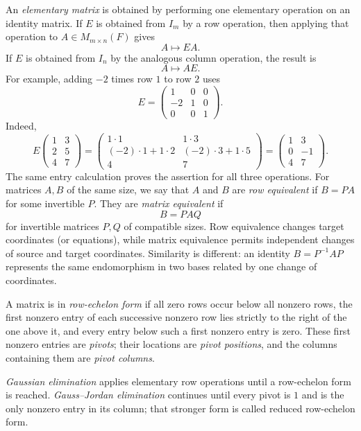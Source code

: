 An \emph{elementary matrix} is obtained by performing one elementary
operation on an identity matrix.  If \(E\) is obtained from \(I_m\) by a row
operation, then applying that operation to \(A\in M_{m\times n}(F)\) gives
\[
A\longmapsto EA.
\]
If \(E\) is obtained from \(I_n\) by the analogous column operation, the
result is
\[
A\longmapsto AE.
\]
For example, adding \(-2\) times row \(1\) to row \(2\) uses
\[
E=\begin{pmatrix}1&0&0\\-2&1&0\\0&0&1\end{pmatrix}.
\]
Indeed,
\[
E\begin{pmatrix}1&3\\2&5\\4&7\end{pmatrix}
=\begin{pmatrix}
1\cdot1&1\cdot3\\
(-2)\cdot1+1\cdot2&(-2)\cdot3+1\cdot5\\
4&7
\end{pmatrix}
=\begin{pmatrix}1&3\\0&-1\\4&7\end{pmatrix}.
\]
The same entry calculation proves the assertion for all three operations.
For matrices \(A,B\) of the same size, we say that \(A\) and \(B\) are
\emph{row equivalent} if \(B=PA\) for some invertible \(P\).  They are
\emph{matrix equivalent} if
\[
B=PAQ
\]
for invertible matrices \(P,Q\) of compatible sizes.  Row equivalence changes
target coordinates (or equations), while matrix equivalence permits
independent changes of source and target coordinates.  Similarity is
different: an identity \(B=P^{-1}AP\) represents the same endomorphism in two
bases related by one change of coordinates.

\begin{definition}
A matrix is in \emph{row-echelon form} if all zero rows occur below all
nonzero rows, the first nonzero entry of each successive nonzero row lies
strictly to the right of the one above it, and every entry below such a first
nonzero entry is zero.  These first nonzero entries are \emph{pivots}; their
locations are \emph{pivot positions}, and the columns containing them are
\emph{pivot columns}.
\end{definition}

\emph{Gaussian elimination} applies elementary row operations until a
row-echelon form is reached.  \emph{Gauss--Jordan elimination} continues
until every pivot is \(1\) and is the only nonzero entry in its column; that
stronger form is called reduced row-echelon form.

